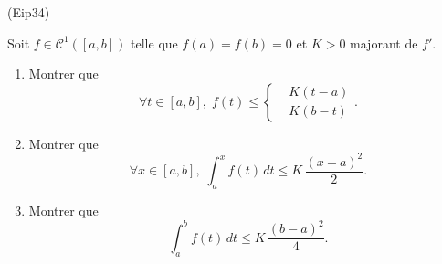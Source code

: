 \begin{tiny}(Eip34)\end{tiny} Soit $f\in \mathcal{C}^{1}(\left[ a,b\right])$ telle que $f(a) = f(b) = 0$ et $K>0$ majorant de $f'$. 
\begin{enumerate}
 \item Montrer que 
\[
 \forall t \in \left[ a,b\right] , \; f(t) \leq 
 \left\lbrace 
 \begin{aligned}
  &K(t-a)\\ & K(b-t)
 \end{aligned}
\right. .
\]
\item Montrer que
\[
\forall x \in \left[ a,b\right] , \; \int_a^x f(t)\,dt \leq K\, \frac{(x-a)^2}{2}. 
\]
\item Montrer que
\[
\int_a^b f(t)\,dt \leq K\, \frac{(b-a)^2}{4}. 
\]
\end{enumerate}
